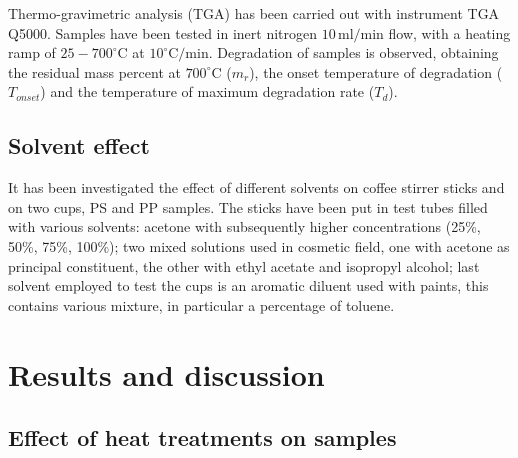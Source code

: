 \documentclass[a4paper, 11pt]{article}
\begin{document}
Thermo-gravimetric analysis (TGA) has been carried out with instrument TGA Q5000. Samples have been tested in inert nitrogen $10\,\text{ml/min}$ flow, with a heating ramp of $25-700^\circ$C at $10^\circ\text{C/min}$. Degradation of samples is observed, obtaining the residual mass percent at $700^\circ$C ($m_r$), the onset temperature of degradation ($T_{onset}$) and the temperature of maximum degradation rate ($T_d$). 

\subsection{Solvent effect}

It has been investigated the effect of different solvents on coffee stirrer sticks and on two cups, PS and PP samples. The sticks have been put in test tubes filled with various solvents: acetone with subsequently higher concentrations (25\%, 50\%, 75\%, 100\%); two mixed solutions used in cosmetic field, one with acetone as principal constituent, the other with ethyl acetate and isopropyl alcohol; last solvent employed to test the cups is an aromatic diluent used with paints, this contains various mixture, in particular a percentage of toluene.

\section{Results and discussion}

\subsection{Effect of heat treatments on samples}
\end{document}
